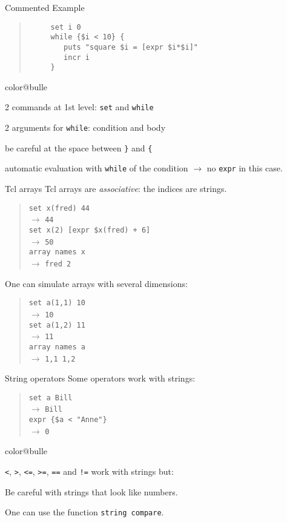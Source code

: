 \documentclass[a4paper,landscape,smooth]{show}
\newcommand{\tclex}[2]{\texttt{#1}\\$\rightarrow$ \texttt{#2}}
\begin{document}
\begin{tslide}{Commented Example}
   \vfill
   \begin{quote}
      \begin{verbatim}
	 set i 0
	 while {$i < 10} {
	    puts "square $i = [expr $i*$i]"
	    incr i
	 }
      \end{verbatim}
   \end{quote}
   \vfill
   \begin{bitemize}{color@bulle}
      \item 2 commands at 1st level: \texttt{set} and \texttt{while}
      \item 2 arguments for \texttt{while}: condition and body
      \item be careful at the space between \texttt{\}} and \texttt{\{}
      \item automatic evaluation with \texttt{while} of the condition
	 $\rightarrow$ no \texttt{expr} in this case.
   \end{bitemize}
   \vfill
\end{tslide}


\begin{tslide}{Tcl arrays}
   \vfill
   Tcl arrays are \emph{associative}: the indices are strings.
   \begin{quote}
      \tclex{set x(fred) 44}{44}\\
      \tclex{set x(2) [expr \$x(fred) + 6]}{50}\\
      \tclex{array names x}{fred 2}
   \end{quote}

   \vfill
   One can simulate arrays with several dimensions:
   \begin{quote}
      \tclex{set a(1,1) 10}{10}\\
      \tclex{set a(1,2) 11}{11}\\
      \tclex{array names a}{1,1 1,2}
   \end{quote}
   \vfill
\end{tslide}


\begin{tslide}{String operators}
   \vfill
   Some operators work with strings:
   \begin{quote}
      \tclex{set a Bill}{Bill}\\
      \tclex{expr \{\$a < "Anne"\}}{0} 
   \end{quote}
   \vfill
   \begin{bitemize}{color@bulle}
      \item \verb|<|, \verb|>|, \verb|<=|, \verb|>=|, \verb|==| and \verb|!=|
	 work with strings but:
      \item Be careful with strings that look like numbers.
      \item One can use the function \texttt{string compare}.
   \end{bitemize}
   \vfill
\end{tslide}
\end{document}
